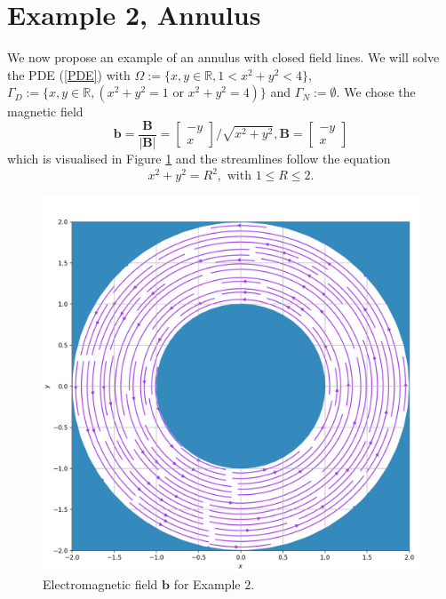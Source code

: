 \documentclass[12pt]{ociamthesis}
\begin{document}
\section{Example 2, Annulus}
We now propose an example of an annulus with closed field lines.
We will solve the PDE (\ref{PDE}) with $\Omega := \{x,y \in \mathbb{R}, 1<x^2+y^2<4\}$, $\Gamma_D := \{x,y \in \mathbb{R}, (x^2+y^2=1 \text{ or } x^2+y^2=4)\}$ and $\Gamma_N := \emptyset$. We chose the magnetic field 
\begin{equation}
\mathbf{b} = \frac{\mathbf{B}}{|\mathbf{B}|} = 
\left[ \begin{matrix}
-y\\
 x
\end{matrix} \right]/\sqrt{x^2+y^2}, 
\mathbf{B} = \left[ \begin{matrix}
-y\\
 x
\end{matrix} \right]
\end{equation}
which is visualised in Figure \ref{E2_VF} and the streamlines follow the equation
\begin{equation}
x^2 + y^2 = R^2, \text{ with } 1\leq R \leq 2.
\end{equation}
\begin{figure}[H]
 \includegraphics[width=\textwidth]{Pics/VectorField/E2b.png}
  \caption{Electromagnetic field $\mathbf{b}$ for Example $2$.}
 \label{E2_VF}
\end{figure}
\end{document}
